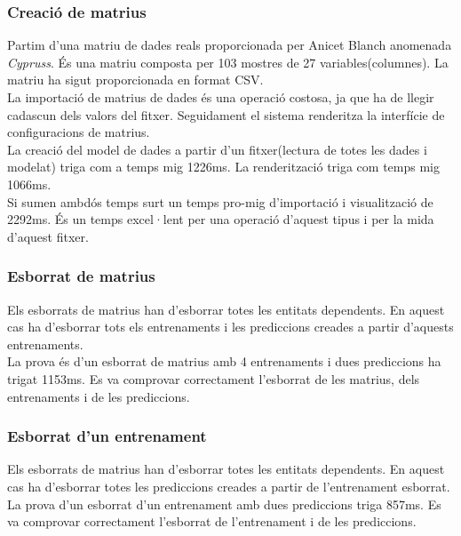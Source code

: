 \subsubsection{Creaci\'{o} de matrius}
\label{cypruss}
Partim d'una matriu de dades reals proporcionada per Anicet Blanch anomenada \textit{Cypruss}. \'{E}s una matriu composta per 103 mostres de 27 variables(columnes). La matriu ha sigut proporcionada en format CSV.\\

La importaci\'{o} de matrius de dades \'{e}s una operaci\'{o} costosa, ja que ha de llegir cadascun dels valors del fitxer. Seguidament el sistema renderitza la interfície de configuracions de matrius.\\

La creaci\'{o} del model de dades a partir d'un fitxer(lectura de totes les dades i modelat) triga com a temps mig 1226ms. La renderitzaci\'{o} triga com temps mig 1066ms.\\

Si sumen ambdós temps surt un temps pro-mig d'importació i visualització de 2292ms. \'{E}s un temps excel·lent per una operació d'aquest tipus i per la mida d'aquest fitxer.

\subsubsection{Esborrat de matrius}
Els esborrats de matrius han d'esborrar totes les entitats dependents. En aquest cas ha d'esborrar tots els entrenaments i les prediccions creades a partir d'aquests entrenaments.\\

La prova \'{e}s d'un esborrat de matrius amb 4 entrenaments i dues prediccions ha trigat 1153ms. Es va comprovar correctament l'esborrat de les matrius, dels entrenaments i de les prediccions.

\subsubsection{Esborrat d'un entrenament}
Els esborrats de matrius han d'esborrar totes les entitats dependents. En aquest cas ha d'esborrar totes les prediccions creades a partir de l'entrenament esborrat.\\

La prova d'un esborrat d'un entrenament amb dues prediccions triga 857ms. Es va comprovar correctament l'esborrat de l'entrenament i de les prediccions.

